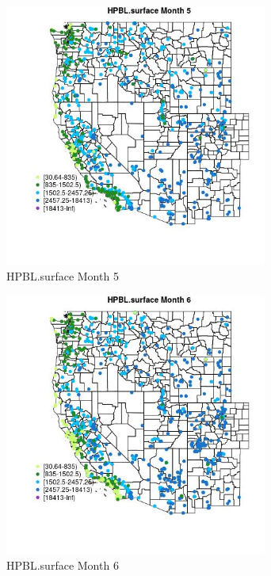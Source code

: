 \begin{figure} 
\centering  
\includegraphics[width=0.77\textwidth]{Code_Outputs/Report_ML_input_PM25_Step4_part_f_de_duplicated_aves_prioritize_24hr_obswNAs_MapObsMo5HPBLsurface.jpg} 
\caption{\label{fig:Report_ML_input_PM25_Step4_part_f_de_duplicated_aves_prioritize_24hr_obswNAsMapObsMo5HPBLsurface}HPBL.surface Month 5} 
\end{figure} 
 

\begin{figure} 
\centering  
\includegraphics[width=0.77\textwidth]{Code_Outputs/Report_ML_input_PM25_Step4_part_f_de_duplicated_aves_prioritize_24hr_obswNAs_MapObsMo6HPBLsurface.jpg} 
\caption{\label{fig:Report_ML_input_PM25_Step4_part_f_de_duplicated_aves_prioritize_24hr_obswNAsMapObsMo6HPBLsurface}HPBL.surface Month 6} 
\end{figure} 
 

